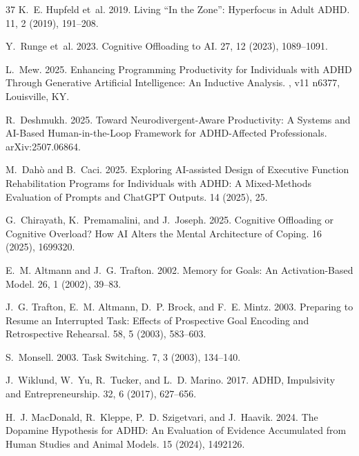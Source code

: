 \documentclass[sigconf,nonacm]{acmart}
\begin{document}
\begin{thebibliography}{37}
K.~E. Hupfeld et~al. 2019.
\newblock Living ``In the Zone'': Hyperfocus in Adult ADHD.
 11, 2 (2019), 191--208.

Y.~Runge et~al. 2023.
\newblock Cognitive Offloading to AI.
 27, 12 (2023), 1089--1091.

L.~Mew. 2025.
\newblock Enhancing Programming Productivity for Individuals with ADHD Through Generative Artificial Intelligence: An Inductive Analysis.
, v11 n6377, Louisville, KY.

R.~Deshmukh. 2025.
\newblock Toward Neurodivergent-Aware Productivity: A Systems and AI-Based Human-in-the-Loop Framework for ADHD-Affected Professionals.
 arXiv:2507.06864.

M.~Dah\`{o} and B.~Caci. 2025.
\newblock Exploring AI-assisted Design of Executive Function Rehabilitation Programs for Individuals with ADHD: A Mixed-Methods Evaluation of Prompts and ChatGPT Outputs.
 14 (2025), 25.

G.~Chirayath, K.~Premamalini, and J.~Joseph. 2025.
\newblock Cognitive Offloading or Cognitive Overload? How AI Alters the Mental Architecture of Coping.
 16 (2025), 1699320.

E.~M. Altmann and J.~G. Trafton. 2002.
\newblock Memory for Goals: An Activation-Based Model.
 26, 1 (2002), 39--83.

J.~G. Trafton, E.~M. Altmann, D.~P. Brock, and F.~E. Mintz. 2003.
\newblock Preparing to Resume an Interrupted Task: Effects of Prospective Goal Encoding and Retrospective Rehearsal.
 58, 5 (2003), 583--603.

S.~Monsell. 2003.
\newblock Task Switching.
 7, 3 (2003), 134--140.

J.~Wiklund, W.~Yu, R.~Tucker, and L.~D. Marino. 2017.
\newblock ADHD, Impulsivity and Entrepreneurship.
 32, 6 (2017), 627--656.

H.~J. MacDonald, R.~Kleppe, P.~D. Szigetvari, and J.~Haavik. 2024.
\newblock The Dopamine Hypothesis for ADHD: An Evaluation of Evidence Accumulated from Human Studies and Animal Models.
 15 (2024), 1492126.


\end{thebibliography}
\end{document}
